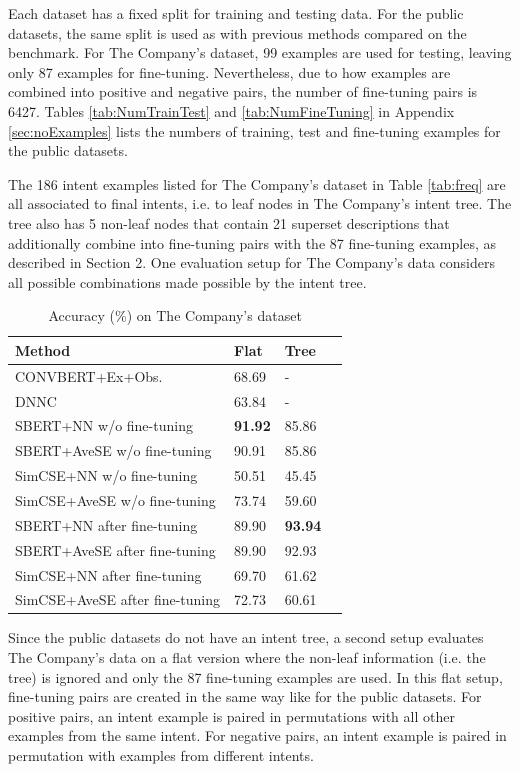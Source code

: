 \documentclass[sigconf, anonymous=true]{acmart}
\begin{document}
Each dataset has a fixed split for training and testing data. For the public datasets, the same split is used as with previous methods compared on the benchmark. For The Company's dataset, 99 examples are used for testing, leaving only 87 examples for fine-tuning. Nevertheless, due to how examples are combined into positive and negative pairs, the number of fine-tuning pairs is 6427. Tables \ref{tab:NumTrainTest} and \ref{tab:NumFineTuning} in Appendix \ref{sec:noExamples} lists the numbers of training, test and fine-tuning examples for the public datasets. 

The 186 intent examples listed for The Company's dataset in Table \ref{tab:freq} are all associated to final intents, i.e. to leaf nodes in The Company's intent tree. The tree also has 5 non-leaf nodes that contain 21 superset descriptions that additionally combine into fine-tuning pairs with the 87 fine-tuning examples, as described in Section 2. One evaluation setup for The Company's data considers all possible combinations made possible by the intent tree. 

\begin{table}[b]
\setlength{} %
\footnotesize\centering
\begin{tabular}{llll}
\hline \textbf{Method} & \textbf{Flat} & \textbf{Tree} \\
\hline
CONVBERT+Ex+Obs. & 68.69 & - \\
DNNC & 63.84 & - \\
\hline SBERT+NN w/o fine-tuning & \textbf{91.92} & 85.86  \\
SBERT+AveSE w/o fine-tuning & 90.91 & 85.86  \\
SimCSE+NN w/o fine-tuning & 50.51 & 45.45  \\
SimCSE+AveSE w/o fine-tuning & 73.74 & 59.60  \\
\midrule
SBERT+NN after fine-tuning & 89.90 & \textbf{93.94}  \\
SBERT+AveSE after fine-tuning & 89.90 & 92.93  \\
SimCSE+NN after fine-tuning & 69.70 & 61.62  \\
SimCSE+AveSE after fine-tuning & 72.73 & 60.61  \\
\midrule
\end{tabular}
\caption{Accuracy (\%) on The Company's dataset}
\label{tab:accuracyIntact}
\end{table}

Since the public datasets do not have an intent tree, a second setup evaluates The Company's data on a flat version where the non-leaf information (i.e. the tree) is ignored and only the 87 fine-tuning examples are used. In this flat setup, fine-tuning pairs are created in the same way like for the public datasets. For positive pairs, an intent example is paired in permutations with all other examples from the same intent. For negative pairs, an intent example is paired in permutation with examples from different intents. 
\end{document}
